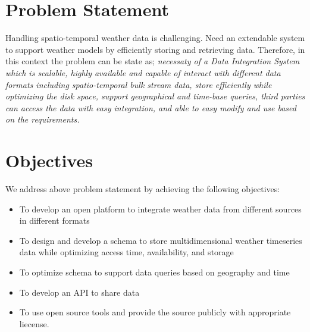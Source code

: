 \section{Problem Statement}
Handling spatio-temporal weather data is challenging. Need an extendable system to support weather models by efficiently storing and retrieving data. Therefore, in this context the problem can be state as;
\emph{necessaty of a Data Integration System which is scalable, highly available and capable of 
interact with different data formats including spatio-temporal bulk stream data, 
store efficiently while optimizing the disk space,
support geographical and time-base queries,
third parties can access the data with easy integration, and
able to easy modify and use based on the requirements.
}

\section{Objectives}
We address above problem statement by achieving the following objectives:
\begin{itemize}
    \item To develop an open platform to integrate weather data from different sources in different formats
    \item To design and develop a schema to store multidimensional weather timeseries data while optimizing access time, availability, and storage
    \item To optimize schema to support data queries based on geography and time
    \item To develop an API to share data
    \item To use open source tools and provide the source publicly with appropriate liecense.
\end{itemize}
